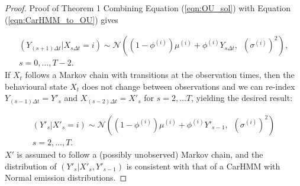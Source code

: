 \begin{proof}{Proof of Theorem 1}{}
Combining Equation (\ref{eqn:OU_sol}) with Equation (\ref{eqn:CarHMM_to_OU}) gives

\begin{align*}
    \left(Y_{(s+1) \Delta t} | X_{s\Delta t} = i \right) \sim \mathcal{N}\left((1-\phi^{(i)}) \mu^{(i)} + \phi^{(i)} Y_{s \Delta t}, \enspace \left(\sigma^{(i)}\right)^2 \right),\\
    s = 0, \ldots, T-2.
\end{align*}
%
If $X_t$ follows a Markov chain with transitions at the observation times, then the behavioural state $X_t$ does not change between observations and we can re-index $Y_{(s-1) \Delta t} = Y'_s$ and $X_{(s-2)\Delta t} = X'_s$ for $s = 2,\ldots T$, yielding the desired result:

\begin{align*}
    \left(Y'_s| X'_s = i \right) \sim \mathcal{N}\left((1-\phi^{(i)}) \mu^{(i)} + \phi^{(i)} Y'_{s-1}, \enspace \left(\sigma^{(i)}\right)^2 \right)\\
    s = 2, \ldots, T.
\end{align*}
%
$X'$ is assumed to follow a (possibly unobserved) Markov chain, and the distribution of $(Y'_s|X'_s,Y'_{s-1})$ is consistent with that of a CarHMM with Normal emission distributions.
\end{proof}

\fi
